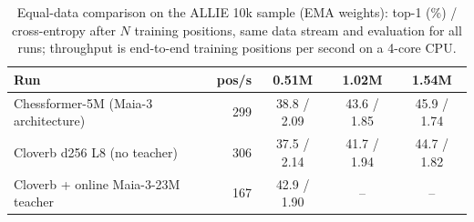 \begin{table}[t]\centering\small
\caption{Equal-data comparison on the ALLIE 10k sample (EMA weights): top-1 (\%) / cross-entropy after $N$ training positions, same data stream and evaluation for all runs; throughput is end-to-end training positions per second on a 4-core CPU.}\label{tab:arch}
\begin{tabular}{lrccc}\toprule
Run & pos/s & 0.51M & 1.02M & 1.54M\\\midrule
Chessformer-5M (Maia-3 architecture) & 299 & 38.8 / 2.09 & 43.6 / 1.85 & 45.9 / 1.74 \\
Cloverb d256 L8 (no teacher) & 306 & 37.5 / 2.14 & 41.7 / 1.94 & 44.7 / 1.82 \\
Cloverb + online Maia-3-23M teacher & 167 & 42.9 / 1.90 & -- & -- \\
\bottomrule\end{tabular}\end{table}
